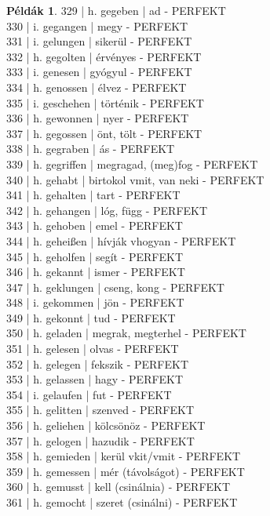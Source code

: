 \documentclass{article}
\theoremstyle{definition}
\newtheorem*{exmp}{Példák}
\begin{document}
\begin{exmp}
329 | h. gegeben | ad - PERFEKT\\
330 | i. gegangen | megy - PERFEKT\\
331 | i. gelungen | sikerül - PERFEKT\\
332 | h. gegolten | érvényes - PERFEKT\\
333 | i. genesen | gyógyul - PERFEKT\\
334 | h. genossen | élvez - PERFEKT\\
335 | i. geschehen | történik - PERFEKT\\
336 | h. gewonnen | nyer - PERFEKT\\
337 | h. gegossen | önt, tölt - PERFEKT\\
338 | h. gegraben | ás - PERFEKT\\
339 | h. gegriffen | megragad, (meg)fog - PERFEKT\\
340 | h. gehabt | birtokol vmit, van neki - PERFEKT\\
341 | h. gehalten | tart - PERFEKT\\
342 | h. gehangen | lóg, függ - PERFEKT\\
343 | h. gehoben | emel - PERFEKT\\
344 | h. geheißen | hívják vhogyan - PERFEKT\\
345 | h. geholfen | segít - PERFEKT\\
346 | h. gekannt | ismer - PERFEKT\\
347 | h. geklungen | cseng, kong - PERFEKT\\
348 | i. gekommen | jön - PERFEKT\\
349 | h. gekonnt | tud - PERFEKT\\
350 | h. geladen | megrak, megterhel - PERFEKT\\
351 | h. gelesen | olvas - PERFEKT\\
352 | h. gelegen | fekszik - PERFEKT\\
353 | h. gelassen | hagy - PERFEKT\\
354 | i. gelaufen | fut - PERFEKT\\
355 | h. gelitten | szenved - PERFEKT\\
356 | h. geliehen | kölcsönöz - PERFEKT\\
357 | h. gelogen | hazudik - PERFEKT\\
358 | h. gemieden | kerül vkit/vmit - PERFEKT\\
359 | h. gemessen | mér (távolságot) - PERFEKT\\
360 | h. gemusst | kell (csinálnia) - PERFEKT\\
361 | h. gemocht | szeret (csinálni) - PERFEKT\\

\end{exmp}
\end{document}
